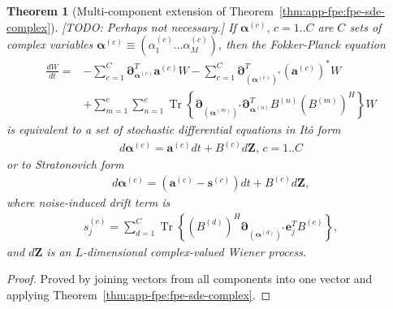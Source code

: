 \documentclass[12pt,aip,jmp,amssymb,amsmath]{revtex4-1}
\newtheorem{theorem}{Theorem}
\begin{document}
\begin{theorem}[Multi-component extension of Theorem~\ref{thm:app-fpe:fpe-sde-complex}]
\label{thm:app-fpe:mc-fpe-sde}
    [TODO: Perhaps not necessary.]
    If $\boldsymbol{\alpha}^{(c)},\, c = 1..C$ are $C$ sets of complex variables $\boldsymbol{\alpha}^{(c)} \equiv (\alpha_1^{(c)} \ldots \alpha_M^{(c)})$, then the Fokker-Planck equation
    \begin{equation}\begin{split}
        \frac{dW}{dt}
        = & - \sum_{c=1}^C \boldsymbol{\partial}_{\boldsymbol{\alpha}^{(c)}}^T \boldsymbol{a}^{(c)} W
        - \sum_{c=1}^C \boldsymbol{\partial}_{(\boldsymbol{\alpha}^{(c)})^*}^T (\boldsymbol{a}^{(c)})^* W \\
        & + \sum_{m=1}^c \sum_{n=1}^c
            \operatorname{Tr} \left\{
                \boldsymbol{\partial}_{(\boldsymbol{\alpha}^{(m)})^*}
                \boldsymbol{\partial}_{\boldsymbol{\alpha}^{(n)}}^T
                B^{(n)} (B^{(m)})^H
            \right\} W
    \end{split}\end{equation}
    is equivalent to a set of stochastic differential equations in It\^{o} form
    \begin{equation}\begin{split}
        d\boldsymbol{\alpha}^{(c)} = \boldsymbol{a}^{(c)} dt + B^{(c)} d\boldsymbol{Z},\, c = 1..C
    \end{split}\end{equation}
    or to Stratonovich form
    \begin{equation*}\begin{split}
        d\boldsymbol{\alpha}^{(c)} = (\boldsymbol{a}^{(c)} - \boldsymbol{s}^{(c)}) dt + B^{(c)} d\boldsymbol{Z},
    \end{split}\end{equation*}
    where noise-induced drift term is
    \begin{equation*}\begin{split}
        s_j^{(c)} = \sum_{d=1}^C
            \operatorname{Tr} \left\{ (B^{(d)})^H \boldsymbol{\partial}_{(\boldsymbol{\alpha}^{(d)})^*} \boldsymbol{e}_j^T B^{(c)} \right\},
    \end{split}\end{equation*}
    and $d\boldsymbol{Z}$ is an $L$-dimensional complex-valued Wiener process.
\end{theorem}
\begin{proof}
Proved by joining vectors from all components into one vector and applying Theorem~\ref{thm:app-fpe:fpe-sde-complex}.
\end{proof}
\end{document}
